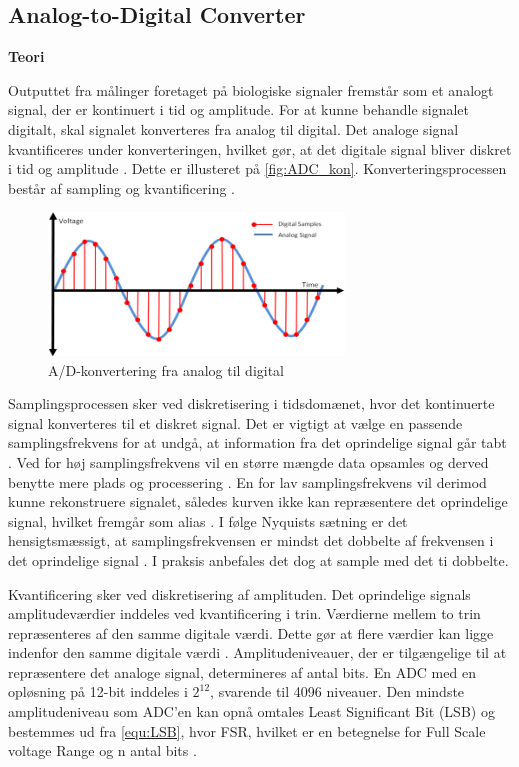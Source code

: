 \subsection{Analog-to-Digital Converter}
\textbf{Teori}

Outputtet fra målinger foretaget på biologiske signaler fremstår som et analogt signal, der er kontinuert i tid og amplitude. For at kunne behandle signalet digitalt, skal signalet konverteres fra analog til digital. Det analoge signal kvantificeres under konverteringen, hvilket gør, at det digitale signal bliver diskret i tid og amplitude \citep{webster1998}. Dette er illusteret på \autoref{fig:ADC_kon}. Konverteringsprocessen består af sampling og kvantificering \citep{morre2003}. 

\begin{figure}[H]
\centering
\includegraphics[width=0.7\textwidth]{figures/problemloesning/adc}
\caption{A/D-konvertering fra analog til digital}
\label{fig:ADC_kon}
\end{figure}

\noindent
Samplingsprocessen sker ved diskretisering i tidsdomænet, hvor det kontinuerte signal konverteres til et diskret signal. Det er vigtigt at vælge en passende samplingsfrekvens for at undgå, at information fra det oprindelige signal går tabt \citep{morre2003}. Ved for høj samplingsfrekvens vil en større mængde data opsamles og derved benytte mere plads og processering \citep{wolf2004}. En for lav samplingsfrekvens vil derimod kunne rekonstruere signalet, således kurven ikke kan repræsentere det oprindelige signal, hvilket fremgår som alias \citep{morre2003}. I følge Nyquists sætning er det hensigtsmæssigt, at samplingsfrekvensen er mindst det dobbelte af frekvensen i det oprindelige signal \citep{morre2003}. I praksis anbefales det dog at sample med det ti dobbelte.

Kvantificering sker ved diskretisering af amplituden. Det oprindelige signals amplitudeværdier inddeles ved kvantificering i trin. Værdierne mellem to trin repræsenteres af den samme digitale værdi. Dette gør at flere værdier kan ligge indenfor den samme digitale værdi \citep{morre2003}. Amplitudeniveauer, der er tilgængelige til at repræsentere det analoge signal, determineres af antal bits. En ADC med en opløsning på 12-bit inddeles i ${2}^{12}$, svarende til 4096 niveauer. Den mindste amplitudeniveau som ADC'en kan opnå omtales Least Significant Bit (LSB) og bestemmes ud fra \autoref{equ:LSB}, hvor FSR, hvilket er en betegnelse for Full Scale voltage Range og n antal bits \citep{webster1998, wolf2004}.

